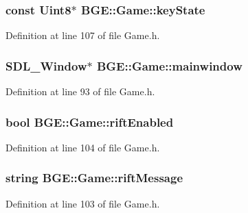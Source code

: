 \hypertarget{class_b_g_e_1_1_game_a9e0095e531e23c2b3368d76ef341ddd9}{
\subsubsection[{key\-State}]{\setlength{\rightskip}{0pt plus 5cm}const Uint8$\ast$ B\-G\-E\-::\-Game\-::key\-State}}\label{class_b_g_e_1_1_game_a9e0095e531e23c2b3368d76ef341ddd9}


Definition at line 107 of file Game.\-h.

\hypertarget{class_b_g_e_1_1_game_a7d79db52e4ae135f72ac7d7e79b5fd89}{
\subsubsection[{mainwindow}]{\setlength{\rightskip}{0pt plus 5cm}S\-D\-L\-\_\-\-Window$\ast$ B\-G\-E\-::\-Game\-::mainwindow}}\label{class_b_g_e_1_1_game_a7d79db52e4ae135f72ac7d7e79b5fd89}


Definition at line 93 of file Game.\-h.

\hypertarget{class_b_g_e_1_1_game_a9c97f2f28873bab23b8b295961cf6ac6}{
\subsubsection[{rift\-Enabled}]{\setlength{\rightskip}{0pt plus 5cm}bool B\-G\-E\-::\-Game\-::rift\-Enabled}}\label{class_b_g_e_1_1_game_a9c97f2f28873bab23b8b295961cf6ac6}


Definition at line 104 of file Game.\-h.

\hypertarget{class_b_g_e_1_1_game_a736d9a0a78227f23a2afb62a9a5bed90}{
\subsubsection[{rift\-Message}]{\setlength{\rightskip}{0pt plus 5cm}string B\-G\-E\-::\-Game\-::rift\-Message}}\label{class_b_g_e_1_1_game_a736d9a0a78227f23a2afb62a9a5bed90}


Definition at line 103 of file Game.\-h.

